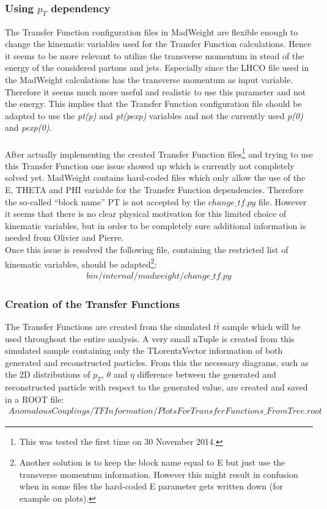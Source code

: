 \subsubsection{Using $p_{T}$ dependency} \label{subsubsec::PtDependency}
The Transfer Function configuration files in MadWeight are flexible enough to change the kinematic variables used for the Transfer Function calculations. Hence it seems to be more relevant to utilize the transverse momentum in stead of the energy of the considered partons and jets. Especially since the LHCO file used in the MadWeight calculations has the transverse momentum as input variable. Therefore it seems much more useful and realistic to use this parameter and not the energy. This implies that the Transfer Function configuration file should be adapted to use the \textit{pt(p)} and \textit{pt(pexp)} variables and not the currently used \textit{p(0)} and \textit{pexp(0)}.\\
\\
After actually implementing the created Transfer Function files\footnote{This was tested the first time on 30 November 2014.} and trying to use this Transfer Function one issue showed up which is currently not completely solved yet. MadWeight contains hard-coded files which only allow the use of the E, THETA and PHI variable for the Transfer Function dependencies. Therefore the so-called ``block name'' PT is not accepted by the $change\_tf.py$ file. However it seems that there is no clear physical motivation for this limited choice of kinematic variables, but in order to be completely sure additional information is needed from Olivier and Pierre.\\
Once this issue is resolved the following file, containing the restricted list of kinematic variables, should be adapted\footnote{Another solution is to keep the block name equal to E but just use the transverse momentum information. However this might result in confusion when in some files the hard-coded E parameter gets written down (for example on plots).}:
\begin{eqnarray*}
 bin/internal/madweight/change\_tf.py
\end{eqnarray*}

\subsubsection{Creation of the Transfer Functions}
The Transfer Functions are created from the simulated $t\bar{t}$ sample which will be used throughout the entire analysis. A very small nTuple is created from this simulated sample containing only the TLorentzVector information of both generated and reconstructed particles. From this the necessary diagrams, such as the 2D distributions of $p_T$, $\theta$ and $\eta$ difference between the generated and reconstructed particle with respect to the generated value, are created and saved in a ROOT file:
\begin{eqnarray*}
 AnomalousCouplings/TFInformation/PlotsForTransferFunctions\_FromTree.root 
\end{eqnarray*}

